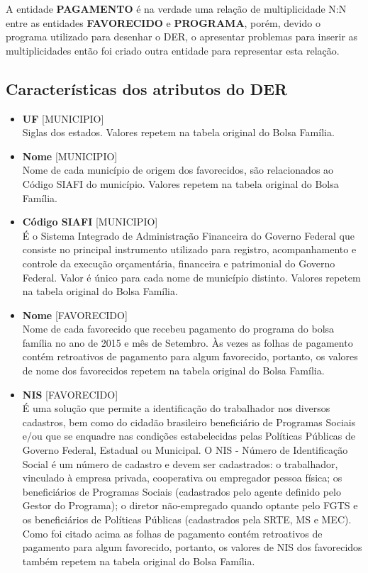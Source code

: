 \documentclass[12pt]{article}
\begin{document}
	A entidade \textbf{PAGAMENTO} é na verdade uma relação de multiplicidade N:N entre as entidades \textbf{FAVORECIDO} e \textbf{PROGRAMA}, porém, devido o programa utilizado para desenhar o DER, o \cite{lucid} apresentar problemas para inserir as multiplicidades então foi criado outra entidade para representar esta relação.
	
	\subsection{Características dos atributos do DER}
	\label{sec:atr}
	
	\begin{itemize}
		\item \textbf{UF} [MUNICIPIO] \\ Siglas dos estados. Valores repetem na tabela original do Bolsa Família.
		\item \textbf{Nome} [MUNICIPIO] \\ Nome de cada município de origem dos favorecidos, são relacionados ao Código SIAFI do município. Valores repetem na tabela original do Bolsa Família.
		\item \textbf{Código SIAFI} [MUNICIPIO] \\  É o Sistema Integrado de Administração Financeira do Governo Federal que consiste no principal instrumento utilizado para registro, acompanhamento e controle da execução orçamentária, financeira e patrimonial do Governo Federal. Valor é único para cada nome de município distinto. Valores repetem na tabela original do Bolsa Família.
		\item \textbf{Nome} [FAVORECIDO] \\ Nome de cada favorecido que recebeu pagamento do programa do bolsa família no ano de 2015 e mês de Setembro. Às vezes as folhas de pagamento contém retroativos de pagamento para algum favorecido, portanto, os valores de nome dos favorecidos repetem na tabela original do Bolsa Família.
		\item \textbf{NIS} [FAVORECIDO] \\ É uma solução que permite a identificação do trabalhador nos diversos cadastros, bem como do cidadão brasileiro beneficiário de Programas Sociais e/ou que se enquadre nas condições estabelecidas pelas Políticas Públicas de Governo Federal, Estadual ou Municipal. O NIS - Número de Identificação Social é um número de cadastro e devem ser cadastrados: o trabalhador, vinculado à empresa privada, cooperativa ou empregador pessoa física; os beneficiários de Programas Sociais (cadastrados pelo agente definido pelo Gestor do Programa); o diretor não-empregado quando optante pelo FGTS e os beneficiários de Políticas Públicas (cadastrados pela SRTE, MS e MEC). Como foi citado acima as folhas de pagamento contém retroativos de pagamento para algum favorecido, portanto, os valores de NIS dos favorecidos também repetem na tabela original do Bolsa Família.

\end{itemize}
\end{document}
